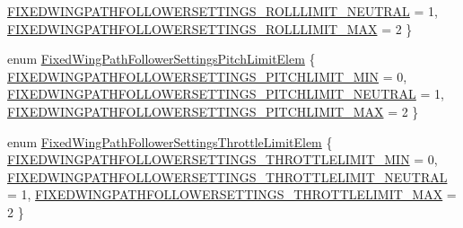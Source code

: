 \begin{DoxyCompactItemize}
\hyperlink{group___fixed_wing_path_follower_settings_gga3ee8ea2d3c59983cbe809de271499e5ea959e03f6972379f2436bf2faea306dd6}{\-F\-I\-X\-E\-D\-W\-I\-N\-G\-P\-A\-T\-H\-F\-O\-L\-L\-O\-W\-E\-R\-S\-E\-T\-T\-I\-N\-G\-S\-\_\-\-R\-O\-L\-L\-L\-I\-M\-I\-T\-\_\-\-N\-E\-U\-T\-R\-A\-L} = 1, 
\hyperlink{group___fixed_wing_path_follower_settings_gga3ee8ea2d3c59983cbe809de271499e5ea8e1522911bad35ce96ba7bee08e501cd}{\-F\-I\-X\-E\-D\-W\-I\-N\-G\-P\-A\-T\-H\-F\-O\-L\-L\-O\-W\-E\-R\-S\-E\-T\-T\-I\-N\-G\-S\-\_\-\-R\-O\-L\-L\-L\-I\-M\-I\-T\-\_\-\-M\-A\-X} = 2
 \}
\item 
enum \hyperlink{group___fixed_wing_path_follower_settings_ga4d76f9852e9c8e84bed9cdfcb5e51f50}{\-Fixed\-Wing\-Path\-Follower\-Settings\-Pitch\-Limit\-Elem} \{ \hyperlink{group___fixed_wing_path_follower_settings_gga4d76f9852e9c8e84bed9cdfcb5e51f50a296aa5ebce435713c860dbf0c97317ba}{\-F\-I\-X\-E\-D\-W\-I\-N\-G\-P\-A\-T\-H\-F\-O\-L\-L\-O\-W\-E\-R\-S\-E\-T\-T\-I\-N\-G\-S\-\_\-\-P\-I\-T\-C\-H\-L\-I\-M\-I\-T\-\_\-\-M\-I\-N} = 0, 
\hyperlink{group___fixed_wing_path_follower_settings_gga4d76f9852e9c8e84bed9cdfcb5e51f50a63d3225351c9e0bb3cf45a2d55bd22d0}{\-F\-I\-X\-E\-D\-W\-I\-N\-G\-P\-A\-T\-H\-F\-O\-L\-L\-O\-W\-E\-R\-S\-E\-T\-T\-I\-N\-G\-S\-\_\-\-P\-I\-T\-C\-H\-L\-I\-M\-I\-T\-\_\-\-N\-E\-U\-T\-R\-A\-L} = 1, 
\hyperlink{group___fixed_wing_path_follower_settings_gga4d76f9852e9c8e84bed9cdfcb5e51f50a7a5916bbea1905ca4869b0a954a40008}{\-F\-I\-X\-E\-D\-W\-I\-N\-G\-P\-A\-T\-H\-F\-O\-L\-L\-O\-W\-E\-R\-S\-E\-T\-T\-I\-N\-G\-S\-\_\-\-P\-I\-T\-C\-H\-L\-I\-M\-I\-T\-\_\-\-M\-A\-X} = 2
 \}
\item 
enum \hyperlink{group___fixed_wing_path_follower_settings_gaeab6fccca577698195681d71710f9fc0}{\-Fixed\-Wing\-Path\-Follower\-Settings\-Throttle\-Limit\-Elem} \{ \hyperlink{group___fixed_wing_path_follower_settings_ggaeab6fccca577698195681d71710f9fc0a217d368c07989f59e0ba76171a822736}{\-F\-I\-X\-E\-D\-W\-I\-N\-G\-P\-A\-T\-H\-F\-O\-L\-L\-O\-W\-E\-R\-S\-E\-T\-T\-I\-N\-G\-S\-\_\-\-T\-H\-R\-O\-T\-T\-L\-E\-L\-I\-M\-I\-T\-\_\-\-M\-I\-N} = 0, 
\hyperlink{group___fixed_wing_path_follower_settings_ggaeab6fccca577698195681d71710f9fc0a8a026ea0fc960745e2f629c9f0cbaf79}{\-F\-I\-X\-E\-D\-W\-I\-N\-G\-P\-A\-T\-H\-F\-O\-L\-L\-O\-W\-E\-R\-S\-E\-T\-T\-I\-N\-G\-S\-\_\-\-T\-H\-R\-O\-T\-T\-L\-E\-L\-I\-M\-I\-T\-\_\-\-N\-E\-U\-T\-R\-A\-L} = 1, 
\hyperlink{group___fixed_wing_path_follower_settings_ggaeab6fccca577698195681d71710f9fc0a0ff621c824af36f35bd5d31284f0abb6}{\-F\-I\-X\-E\-D\-W\-I\-N\-G\-P\-A\-T\-H\-F\-O\-L\-L\-O\-W\-E\-R\-S\-E\-T\-T\-I\-N\-G\-S\-\_\-\-T\-H\-R\-O\-T\-T\-L\-E\-L\-I\-M\-I\-T\-\_\-\-M\-A\-X} = 2
 \}
\end{DoxyCompactItemize}
